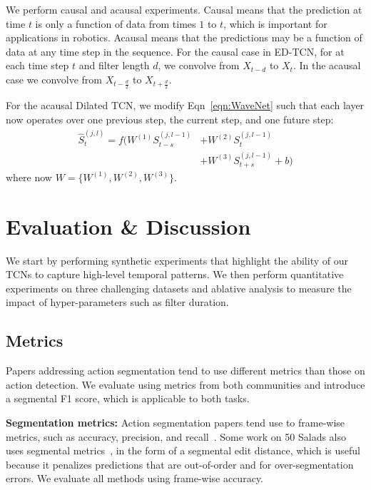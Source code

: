 \documentclass[10pt,twocolumn,letterpaper]{article}
\newcommand{\fakesubsection}[1]{\smallskip\noindent\textbf{#1:}}
\begin{document}
We perform causal and acausal experiments. Causal means that the prediction at time $t$ is only a function of data from times $1$ to $t$, which is important for applications in robotics. Acausal means that the predictions may be a function of data at any time step in the sequence. 
For the causal case in ED-TCN, for at each time step $t$ and filter length $d$, we convolve from $X_{t-d}$ to $X_t$. In the acausal case we convolve from $X_{t-\frac{d}{2}}$ to $X_{t+\frac{d}{2}}$. 


For the acausal Dilated TCN, we modify Eqn~\ref{eqn:WaveNet} such that each layer now operates over one previous step, the current step, and one future step:
\begin{align}
\hat{S}^{(j,l)}_{t} = f(W^{(1)} S^{(j,l-1)}_{t-s} &+ W^{(2)} S^{(j,l-1)}_{t}  \nonumber\\ 
&+ W^{(3)} S^{(j,l-1)}_{t+s} + b)
\end{align}
where now $W = \{W^{(1)}, W^{(2)}, W^{(3)}\}$.




 


\section{Evaluation \& Discussion}
\label{sec:evaluation}
We start by performing synthetic experiments that highlight the ability of our TCNs to capture high-level temporal patterns. We then perform quantitative experiments on three challenging datasets and ablative analysis to measure the impact of hyper-parameters such as filter duration.




\subsection{Metrics}
Papers addressing action segmentation tend to use different metrics than those on action detection. We evaluate using metrics from both communities and introduce a segmental F1 score, which is applicable to both tasks.


\fakesubsection{Segmentation metrics}
Action segmentation papers tend use to frame-wise metrics, such as accuracy, precision, and recall~\cite{stein_ubicomp_2013,kuehne_cvpr_2014}. Some work on 50 Salads also uses segmental metrics~\cite{lea_eccv_2016,lea_icra_2016}, in the form of a segmental edit distance, which is useful because it penalizes predictions that are out-of-order and for over-segmentation errors. We evaluate all methods using frame-wise accuracy.
\end{document}
